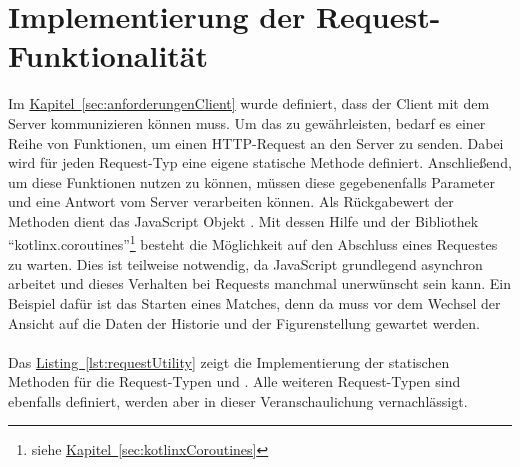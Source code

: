 \section{Implementierung der Request-Funktionalität}\label{sec:requestFunctionality}
Im \hyperref[sec:anforderungenClient]{Kapitel~\ref{sec:anforderungenClient}} wurde definiert, dass der Client mit dem Server kommunizieren können muss. Um das zu gewährleisten, bedarf es einer Reihe von Funktionen, um einen \gls{HTTP}-Request an den Server zu senden. Dabei wird für jeden Request-Typ eine eigene statische Methode definiert. Anschließend, um diese Funktionen nutzen zu können, müssen diese gegebenenfalls Parameter und eine Antwort vom Server verarbeiten können. Als Rückgabewert der Methoden dient das JavaScript Objekt . Mit dessen Hilfe und der Bibliothek \enquote{kotlinx.coroutines}\footnote{siehe \hyperref[sec:kotlinxCoroutines]{Kapitel~\ref{sec:kotlinxCoroutines}}} besteht die Möglichkeit auf den Abschluss eines Requestes zu warten. Dies ist teilweise notwendig, da JavaScript grundlegend asynchron arbeitet und dieses Verhalten bei Requests manchmal unerwünscht sein kann. Ein Beispiel dafür ist das Starten eines Matches, denn da muss vor dem Wechsel der Ansicht auf die Daten der Historie und der Figurenstellung gewartet werden.\\
\\
Das \hyperref[lst:requestUtility]{Listing~\ref{lst:requestUtility}} zeigt die Implementierung der statischen Methoden für die Request-Typen  und . Alle weiteren Request-Typen sind ebenfalls definiert, werden aber in dieser Veranschaulichung vernachlässigt.\\
